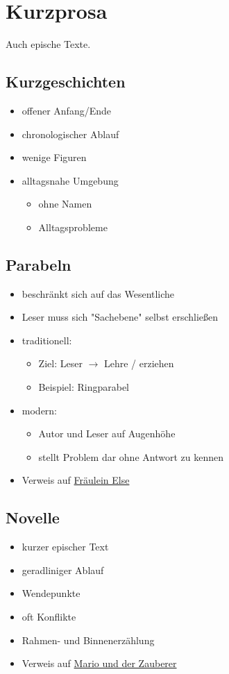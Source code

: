 
\section{Kurzprosa}
Auch epische Texte.

\subsection{Kurzgeschichten}
\begin{itemize}
    \item offener Anfang/Ende
    \item chronologischer Ablauf
    \item wenige Figuren
    \item alltagsnahe Umgebung
    \begin{itemize}
        \item ohne Namen
        \item Alltagsprobleme
    \end{itemize}
\end{itemize}


\subsection{Parabeln}
\begin{itemize}
    \item beschränkt sich auf das Wesentliche
    \item Leser muss sich "Sachebene" selbst erschließen
    \item traditionell:
    \begin{itemize}
        \item Ziel: Leser $\rightarrow$ Lehre / erziehen
        \item Beispiel: Ringparabel
    \end{itemize}
    \item modern:
    \begin{itemize}
        \item Autor und Leser auf Augenhöhe
        \item stellt Problem dar ohne Antwort zu kennen
    \end{itemize}
    \item Verweis auf \hyperref[sec:frauleinelse]{Fräulein Else}
\end{itemize}


\subsection{Novelle}
\begin{itemize}
    \item kurzer epischer Text
    \item geradliniger Ablauf
    \item Wendepunkte
    \item oft Konflikte
    \item Rahmen- und Binnenerzählung
    \item Verweis auf \hyperref[sec:mario]{Mario und der Zauberer}
\end{itemize}
